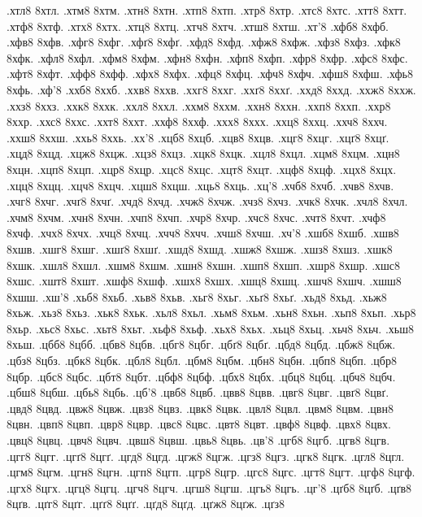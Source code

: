 {.хтл8
8хтл.
.хтм8
8хтм.
.хтн8
8хтн.
.хтп8
8хтп.
.хтр8
8хтр.
.хтс8
8хтс.
.хтт8
8хтт.
.хтф8
8хтф.
.хтх8
8хтх.
.хтц8
8хтц.
.хтч8
8хтч.
.хтш8
8хтш.
.хт'8
.хфб8
8хфб.
.хфв8
8хфв.
.хфг8
8хфг.
.хфґ8
8хфґ.
.хфд8
8хфд.
.хфж8
8хфж.
.хфз8
8хфз.
.хфк8
8хфк.
.хфл8
8хфл.
.хфм8
8хфм.
.хфн8
8хфн.
.хфп8
8хфп.
.хфр8
8хфр.
.хфс8
8хфс.
.хфт8
8хфт.
.хфф8
8хфф.
.хфх8
8хфх.
.хфц8
8хфц.
.хфч8
8хфч.
.хфш8
8хфш.
.хфь8
8хфь.
.хф'8
.ххб8
8ххб.
.ххв8
8ххв.
.ххг8
8ххг.
.ххґ8
8ххґ.
.ххд8
8ххд.
.ххж8
8ххж.
.ххз8
8ххз.
.ххк8
8ххк.
.ххл8
8ххл.
.ххм8
8ххм.
.ххн8
8ххн.
.ххп8
8ххп.
.ххр8
8ххр.
.ххс8
8ххс.
.ххт8
8ххт.
.ххф8
8ххф.
.ххх8
8ххх.
.ххц8
8ххц.
.ххч8
8ххч.
.ххш8
8ххш.
.ххь8
8ххь.
.хх'8
.хцб8
8хцб.
.хцв8
8хцв.
.хцг8
8хцг.
.хцґ8
8хцґ.
.хцд8
8хцд.
.хцж8
8хцж.
.хцз8
8хцз.
.хцк8
8хцк.
.хцл8
8хцл.
.хцм8
8хцм.
.хцн8
8хцн.
.хцп8
8хцп.
.хцр8
8хцр.
.хцс8
8хцс.
.хцт8
8хцт.
.хцф8
8хцф.
.хцх8
8хцх.
.хцц8
8хцц.
.хцч8
8хцч.
.хцш8
8хцш.
.хць8
8хць.
.хц'8
.хчб8
8хчб.
.хчв8
8хчв.
.хчг8
8хчг.
.хчґ8
8хчґ.
.хчд8
8хчд.
.хчж8
8хчж.
.хчз8
8хчз.
.хчк8
8хчк.
.хчл8
8хчл.
.хчм8
8хчм.
.хчн8
8хчн.
.хчп8
8хчп.
.хчр8
8хчр.
.хчс8
8хчс.
.хчт8
8хчт.
.хчф8
8хчф.
.хчх8
8хчх.
.хчц8
8хчц.
.хчч8
8хчч.
.хчш8
8хчш.
.хч'8
.хшб8
8хшб.
.хшв8
8хшв.
.хшг8
8хшг.
.хшґ8
8хшґ.
.хшд8
8хшд.
.хшж8
8хшж.
.хшз8
8хшз.
.хшк8
8хшк.
.хшл8
8хшл.
.хшм8
8хшм.
.хшн8
8хшн.
.хшп8
8хшп.
.хшр8
8хшр.
.хшс8
8хшс.
.хшт8
8хшт.
.хшф8
8хшф.
.хшх8
8хшх.
.хшц8
8хшц.
.хшч8
8хшч.
.хшш8
8хшш.
.хш'8
.хьб8
8хьб.
.хьв8
8хьв.
.хьг8
8хьг.
.хьґ8
8хьґ.
.хьд8
8хьд.
.хьж8
8хьж.
.хьз8
8хьз.
.хьк8
8хьк.
.хьл8
8хьл.
.хьм8
8хьм.
.хьн8
8хьн.
.хьп8
8хьп.
.хьр8
8хьр.
.хьс8
8хьс.
.хьт8
8хьт.
.хьф8
8хьф.
.хьх8
8хьх.
.хьц8
8хьц.
.хьч8
8хьч.
.хьш8
8хьш.
.цбб8
8цбб.
.цбв8
8цбв.
.цбг8
8цбг.
.цбґ8
8цбґ.
.цбд8
8цбд.
.цбж8
8цбж.
.цбз8
8цбз.
.цбк8
8цбк.
.цбл8
8цбл.
.цбм8
8цбм.
.цбн8
8цбн.
.цбп8
8цбп.
.цбр8
8цбр.
.цбс8
8цбс.
.цбт8
8цбт.
.цбф8
8цбф.
.цбх8
8цбх.
.цбц8
8цбц.
.цбч8
8цбч.
.цбш8
8цбш.
.цбь8
8цбь.
.цб'8
.цвб8
8цвб.
.цвв8
8цвв.
.цвг8
8цвг.
.цвґ8
8цвґ.
.цвд8
8цвд.
.цвж8
8цвж.
.цвз8
8цвз.
.цвк8
8цвк.
.цвл8
8цвл.
.цвм8
8цвм.
.цвн8
8цвн.
.цвп8
8цвп.
.цвр8
8цвр.
.цвс8
8цвс.
.цвт8
8цвт.
.цвф8
8цвф.
.цвх8
8цвх.
.цвц8
8цвц.
.цвч8
8цвч.
.цвш8
8цвш.
.цвь8
8цвь.
.цв'8
.цгб8
8цгб.
.цгв8
8цгв.
.цгг8
8цгг.
.цгґ8
8цгґ.
.цгд8
8цгд.
.цгж8
8цгж.
.цгз8
8цгз.
.цгк8
8цгк.
.цгл8
8цгл.
.цгм8
8цгм.
.цгн8
8цгн.
.цгп8
8цгп.
.цгр8
8цгр.
.цгс8
8цгс.
.цгт8
8цгт.
.цгф8
8цгф.
.цгх8
8цгх.
.цгц8
8цгц.
.цгч8
8цгч.
.цгш8
8цгш.
.цгь8
8цгь.
.цг'8
.цґб8
8цґб.
.цґв8
8цґв.
.цґг8
8цґг.
.цґґ8
8цґґ.
.цґд8
8цґд.
.цґж8
8цґж.
.цґз8
}
